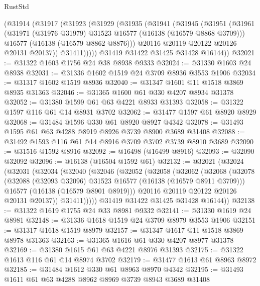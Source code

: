 \begin{lexlean}{RustStd}
\begin{coremodule}
      (@31914
        (@31917
          (@31923
            (@31929
              (@31935
                (@31941
                  (@31945
                    (@31951
                      (@31961
                        (@31971 (@31976 @31979) @31523 @16577 (@16138 (@16579 @8868 @3709)))
                        @16577
                        (@16138 (@16579 @8862 @8876)))
                      @20116
                      @20119
                      @20122
                      @20126
                      @20131
                      @20137))
                  @31411)))))
        @31419
        @31422
        @31425
        @31428
        @16144))
@32021 := @31322 @1603 @1756 @24 @38 @8938 @9333
@32024 := @31330 @1603 @24 @8938
@32031 := @31336 @1602 @1519 @24 @3709 @8936 @3553 @1906
@32034 := @31317 @1602 @1519 @8936
@32040 := @31347 @1601 @11 @1518 @3869 @8935 @31363
@32046 := @31365 @1600 @61 @330 @4207 @8934 @31378
@32052 := @31380 @1599 @61 @63 @4221 @8933 @31393
@32058 := @31322 @1597 @116 @61 @14 @8931 @3702
@32062 := @31477 @1597 @61 @8920 @8929
@32068 := @31484 @1596 @330 @61 @8920 @8927 @4342
@32078 := @31493 @1595 @61 @63 @4288 @8919 @8926 @3739 @8900 @3689 @31408
@32088 := @31492 @1593 @116 @61 @14 @8916 @3709 @3702 @3739 @8910 @3689
@32090 := @31516 @1592 @8916
@32092 := @16498 (@16499 @8916)
@32093 := @32090 @32092
@32096 := @16138 (@16504 @1592 @61)
@32132 := @32021
    (@32024
      (@32031
        (@32034
          (@32040
            (@32046
              (@32052
                (@32058
                  (@32062
                    (@32068
                      (@32078
                        (@32088 (@32093 @32096) @31523 @16577 (@16138 (@16579 @8911 @3709)))
                        @16577
                        (@16138 (@16579 @8901 @8919)))
                      @20116
                      @20119
                      @20122
                      @20126
                      @20131
                      @20137))
                  @31411)))))
        @31419
        @31422
        @31425
        @31428
        @16144))
@32138 := @31322 @1619 @1755 @24 @33 @8981 @9332
@32141 := @31330 @1619 @24 @8981
@32148 := @31336 @1618 @1519 @24 @3709 @8979 @3553 @1906
@32151 := @31317 @1618 @1519 @8979
@32157 := @31347 @1617 @11 @1518 @3869 @8978 @31363
@32163 := @31365 @1616 @61 @330 @4207 @8977 @31378
@32169 := @31380 @1615 @61 @63 @4221 @8976 @31393
@32175 := @31322 @1613 @116 @61 @14 @8974 @3702
@32179 := @31477 @1613 @61 @8963 @8972
@32185 := @31484 @1612 @330 @61 @8963 @8970 @4342
@32195 := @31493 @1611 @61 @63 @4288 @8962 @8969 @3739 @8943 @3689 @31408

\end{coremodule}
\end{lexlean}
